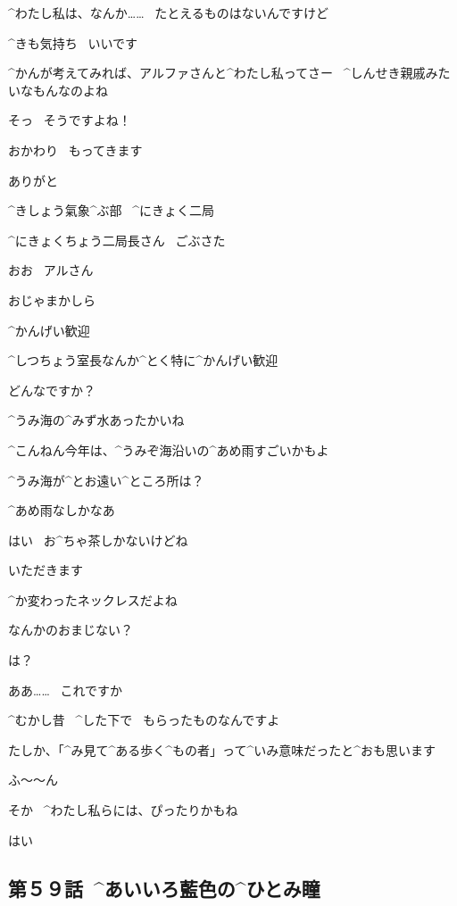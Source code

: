 \page[45]
\Alpha ^{わたし}{私}は、なんか……
\ たとえるものはないんですけど

\Alpha ^{きも}{気持}ち
\ いいです

\page[46]
\Sensei ^{かんが}{考}えてみれば、アルファさんと^{わたし}{私}ってさー
\ ^{しんせき}{親戚}みたいなもんなのよね

\Alpha そっ
\ そうですよね！

\page[47]
\Alpha おかわり
\ もってきます

\Sensei ありがと

\page[49]
\Sign ^{きしょう}{氣象}^{ぶ}{部}
\ ^{にきょく}{二局}

\page[50]
\ASevenMOne ^{にきょくちょう}{二局長}さん
\ ごぶさた

\Person おお
\ アルさん

\ASevenMOne おじゃまかしら

\Person ^{かんげい}{歓迎}

\Person ^{しつちょう}{室長}なんか^{とく}{特}に^{かんげい}{歓迎}

\page[51]
\ASevenMOne どんなですか？

\Person ^{うみ}{海}の^{みず}{水}あったかいね

\Person ^{こんねん}{今年}は、^{うみぞ}{海沿}いの^{あめ}{雨}すごいかもよ

\ASevenMOne ^{うみ}{海}が^{とお}{遠}い^{ところ}{所}は？

\Person ^{あめ}{雨}なしかなあ

\Person はい
\ お^{ちゃ}{茶}しかないけどね

\ASevenMOne いただきます

\page[53]
\Person ^{か}{変}わったネックレスだよね

\Person なんかのおまじない？

\ASevenMOne は？

\ASevenMOne ああ……
\ これですか

\page[54]
\ASevenMOne ^{むかし}{昔}
\ ^{した}{下}で
\ もらったものなんですよ

\ASevenMOne たしか、「^{み}{見}て^{ある}{歩}く^{もの}{者}」って^{いみ}{意味}だったと^{おも}{思}います

\Person ふ〜〜ん

\page[55]
\Person そか
\ ^{わたし}{私}らには、ぴったりかもね

\ASevenMOne はい


\subsection{第５９話\ ^{あいいろ}{藍色}の^{ひとみ}{瞳}}

